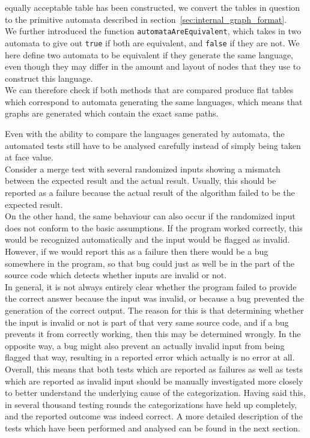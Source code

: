 \documentclass[a4paper,12pt,twoside,BCOR=10mm]{scrbook}
\begin{document}
equally acceptable table has been constructed, we convert the tables in question to the
primitive automata described in section~\ref{sec:internal_graph_format}. \\
We further introduced the function \texttt{automataAreEquivalent}, which
takes in two automata to give out \texttt{true} if both are equivalent,
and \texttt{false} if they are not. We here define two automata to be
equivalent if they generate the same language, even though they may differ
in the amount and layout of nodes that they use to construct this language. \\
We can therefore check if both methods that are compared produce flat tables
which correspond to automata generating the same languages, which means
that graphs are generated which contain the exact same paths.

Even with the ability to compare the languages generated by automata,
the automated tests still have to be analysed carefully instead of
simply being taken at face value. \\
Consider a merge test with several randomized inputs showing a mismatch
between the expected result and the actual result.
Usually, this should be reported as a failure because the actual result of the algorithm
failed to be the expected result. \\
On the other hand, the same behaviour can also occur if the randomized input
does not conform to the basic assumptions. If the program worked correctly,
this would be recognized automatically and the input would be flagged as invalid.
However, if we would report this as a failure then there would be a bug somewhere
in the program, so that bug could just as well be in the part of the source code
which detects whether inputs are invalid or not. \\
In general, it is not always entirely clear whether the program failed to provide the correct answer
because the input was invalid, or because a bug prevented the generation of the correct output.
The reason for this is that determining whether the input is invalid or not is part of that
very same source code, and if a bug prevents it from correctly working, then this may be determined
wrongly. In the opposite way, a bug might also prevent an actually invalid input from being
flagged that way, resulting in a reported error which actually is no error at all. \\
Overall, this means that both tests which are reported as failures as well as tests which are reported as invalid input
should be manually investigated more closely to
better understand the underlying cause of the categorization.
Having said this, in several thousand testing rounds the categorizations have held up completely,
and the reported outcome was indeed correct. A more detailed description of the tests which have been performed
and analysed can be found in the next section.
\end{document}
